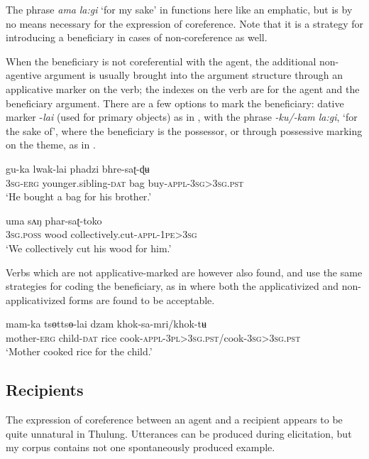 \documentclass[output=paper]{langscibook}
\begin{document}
The phrase \textit{ama} \textit{la:gi} ‘for my sake' in  functions here like an emphatic, but is by no means necessary for the expression of coreference.  Note that it is a strategy for introducing a beneficiary in cases of non-coreference as well.

When the beneficiary is not coreferential with the agent, the additional non-agentive argument is usually brought into the argument structure through an applicative marker on the verb; the indexes on the verb are for the agent and the beneficiary argument. There are a few options to mark the beneficiary: dative marker -\textit{lai} (used for primary objects) as in , with the phrase \textit{{}-ku/-kam la:gi}, ‘for the sake of', where the beneficiary is the possessor, or through possessive marking on the theme, as in .

\ea%
    \label{ex:Lahaussois:38}
    \gll gu-ka lwak-lai phadzi bhre-saʈ-ɖʉ\\
        \textsc{3sg-erg} younger.sibling-\textsc{dat} bag buy-\textsc{appl-3sg>3sg.pst}\\
    \glt ‘He bought a bag for his brother.'
    \z

\ea%
    \label{ex:Lahaussois:39}
    \gll uma sʌŋ phar-saʈ-toko\\
        \textsc{3sg.poss} wood collectively.cut-\textsc{appl-1pe>3sg}\\
    \glt ‘We collectively cut his wood for him.'
    \z

Verbs which are not applicative-marked are however also found, and use the same strategies for coding the beneficiary, as in  where both the applicativized and non-applicativized forms are found to be acceptable.

\ea%
    \label{ex:Lahaussois:40}
    \gll mam-ka tsɵttsɵ-lai dzam khok-sa-mri/khok-tʉ\\
        mother-\textsc{erg} child\textsc{{}-dat} rice   cook-\textsc{appl-3pl>3sg.pst}/cook-\textsc{3sg>3sg.pst}\\
    \glt ‘Mother cooked rice for the child.'
    \z

\subsection{Recipients}
\label{sec:Lahaussois:5.3}

The expression of coreference between an agent and a recipient appears to be quite unnatural in Thulung.  Utterances can be produced during elicitation, but my corpus contains not one spontaneously produced example. 
\end{document}
